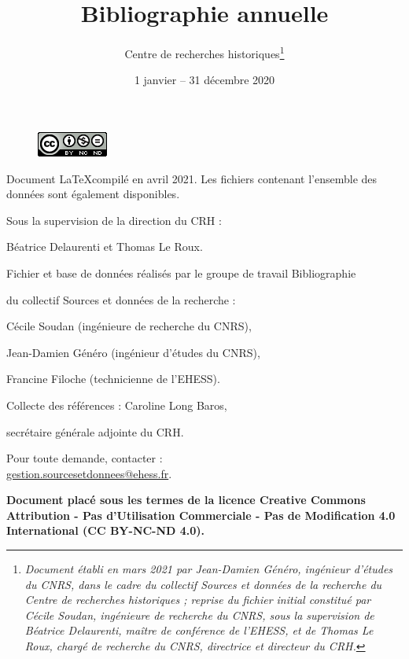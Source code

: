 \documentclass{article}
\title{\textbf{Bibliographie annuelle}}
\author{Centre de recherches historiques\footnote{\textit{Document établi en mars 2021 par Jean-Damien Généro, ingénieur d'études du CNRS, dans le cadre du collectif Sources et données de la recherche du Centre de recherches historiques ; reprise du fichier initial constitué par Cécile Soudan, ingénieure de recherche du CNRS, sous la supervision de Béatrice Delaurenti, maître de conférence de l'EHESS, et de 
Thomas Le Roux, chargé de recherche du CNRS, directrice et directeur du CRH.}}}
\date{1\up{er} janvier -- 31 décembre 2020}
\begin{document}
\renewcommand{\contentsname}{Sommaire}


\newpage
\thispagestyle{empty}

\begin{figure}
    \centering
    \includegraphics{img/licence-cc-icon.png}
    \label{fig:licence}
\end{figure}

\bigskip

\bigskip
\begin{center}
\begin{itshape}

Document \LaTeX compilé en avril 2021. Les fichiers  contenant l'ensemble des données sont également disponibles.

\medskip

Sous la supervision de la direction du CRH :

Béatrice Delaurenti et Thomas Le Roux.

\medskip

Fichier et base de données réalisés par le groupe de travail \og Bibliographie \fg

du collectif \og Sources et données de la recherche \fg :

Cécile Soudan (ingénieure de recherche du CNRS),

Jean-Damien Généro (ingénieur d’études du CNRS),

Francine Filoche (technicienne de l’EHESS).

\medskip

Collecte des références : Caroline Long Baros,

secrétaire générale adjointe du CRH.

\medskip

Pour toute demande, contacter :\\\url{gestion.sourcesetdonnees@ehess.fr}.

\end{itshape}

\bigskip

\bigskip

    \textbf{Document placé sous les termes de la licence Creative Commons Attribution - Pas d'Utilisation Commerciale - Pas de Modification 4.0 International (CC BY-NC-ND 4.0).}
\end{center}
\end{document}

